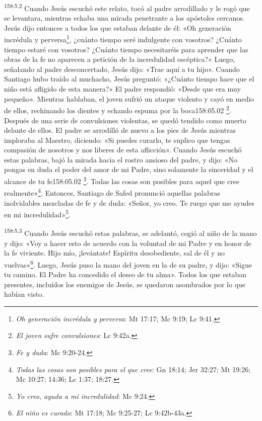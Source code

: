 \par
\textsuperscript{158:5.2} Cuando Jesús escuchó este relato, tocó al padre arrodillado y le rogó que se levantara, mientras echaba una mirada penetrante a los apóstoles cercanos. Jesús dijo entonces a todos los que estaban delante de él: «Oh generación incrédula y perversa\footnote{\textit{Oh generación incrédula y perversa}: Mt 17:17; Mc 9:19; Lc 9:41.}, ¿cuánto tiempo seré indulgente con vosotros? ¿Cuánto tiempo estaré con vosotros? ¿Cuánto tiempo necesitaréis para aprender que las obras de la fe no aparecen a petición de la incredulidad escéptica?» Luego, señalando al padre desconcertado, Jesús dijo: «Trae aquí a tu hijo». Cuando Santiago hubo traído al muchacho, Jesús preguntó: «¿Cuánto tiempo hace que el niño está afligido de esta manera?» El padre respondió: «Desde que era muy pequeño». Mientras hablaban, el joven sufrió un ataque violento y cayó en medio de ellos, rechinando los dientes y echando espuma por la boca158:05.02 \footnote{\textit{El joven sufre convulsiones}: Lc 9:42a.}. Después de una serie de convulsiones violentas, se quedó tendido como muerto delante de ellos. El padre se arrodilló de nuevo a los pies de Jesús mientras imploraba al Maestro, diciendo: «Si puedes curarlo, te suplico que tengas compasión de nosotros y nos liberes de esta aflicción». Cuando Jesús escuchó estas palabras, bajó la mirada hacia el rostro ansioso del padre, y dijo: «No pongas en duda el poder del amor de mi Padre, sino solamente la sinceridad y el alcance de tu fe158:05.02 \footnote{\textit{Fe y duda}: Mc 9:20-24.}. Todas las cosas son posibles para aquel que cree realmente»\footnote{\textit{Todas las cosas son posibles para el que cree}: Gn 18:14; Jer 32:27; Mt 19:26; Mc 10:27; 14:36; Lc 1:37; 18:27.}. Entonces, Santiago de Safed pronunció aquellas palabras inolvidables mezcladas de fe y de duda: «Señor, yo creo. Te ruego que me ayudes en mi incredulidad»\footnote{\textit{Yo creo, ayuda a mi incredulidad}: Mc 9:24.}.

\par
\textsuperscript{158:5.3} Cuando Jesús escuchó estas palabras, se adelantó, cogió al niño de la mano y dijo: «Voy a hacer esto de acuerdo con la voluntad de mi Padre y en honor de la fe viviente. Hijo mío, ¡levántate! Espíritu desobediente, sal de él y no vuelvas»\footnote{\textit{El niño es curado}: Mt 17:18; Mc 9:25-27; Lc 9:42b-43a.}. Luego, Jesús puso la mano del joven en la de su padre, y dijo: «Sigue tu camino. El Padre ha concedido el deseo de tu alma». Todos los que estaban presentes, incluídos los enemigos de Jesús, se quedaron asombrados por lo que habían visto.

